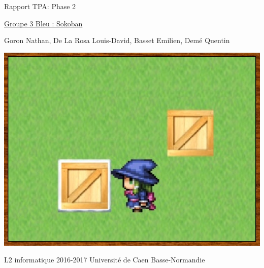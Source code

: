 \documentclass{article}
\begin{document}
\begin{titlepage}
\begin{center}
\Huge Rapport TPA: Phase 2

\normalsize
\vspace{0.5cm}
\Large {\underline{ Groupe 3 Bleu : Sokoban} }

\vspace{1cm}

\normalsize
Goron Nathan, De La Rosa Louis-David, Basset Emilien, Demé Quentin

\vspace{1cm}
\begin{center}
\includegraphics[scale=0.7]{../Screenshots/main.jpg}
\end{center}
\vspace{3.5cm}
L2 informatique 2016-2017 Université de Caen Basse-Normandie
\end{center}
\end{titlepage}


\newpage
\tableofcontents
\end{document}

